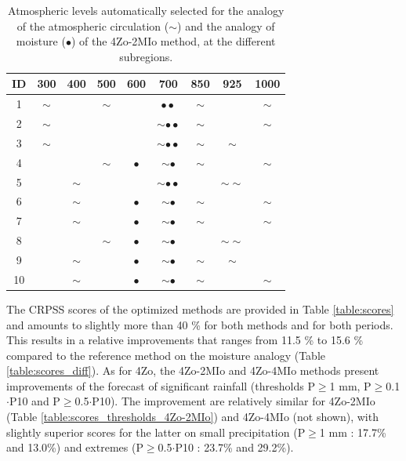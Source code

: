\documentclass[5p]{elsarticle}
\begin{document}
\begin{table}[htbp]
	\caption{Atmospheric levels automatically selected for the analogy of the atmospheric circulation ($\sim$) and the analogy of moisture ($\bullet$) of the 4Zo-2MIo method, at the different subregions.}
	\footnotesize
	\begin{center}
		\begin{tabular}{ccccccccc}
			\hline ID & 300 & 400 & 500 & 600 & 700 & 850 & 925 & 1000 \\ 
			\hline 
			1  & $\sim$ &   & $\sim$ &   & $\bullet \bullet$  & $\sim$ &   & $\sim$ \\
			2  & $\sim$ &   &   &   & $\sim \bullet \bullet$ & $\sim$ &   & $\sim$ \\
			3  & $\sim$ &   &   &   & $\sim \bullet \bullet$ & $\sim$ & $\sim$ &   \\
			4  &   &   & $\sim$ & $\bullet$ & $\sim \bullet$ & $\sim$ &   & $\sim$ \\
			5  &   & $\sim$ &   &   & $\sim \bullet \bullet$ &   & $\sim \sim$ &   \\
			6  &   & $\sim$ &   & $\bullet$ & $\sim \bullet$ & $\sim$ &   & $\sim$ \\
			7  &   & $\sim$ &   & $\bullet$ & $\sim \bullet$ & $\sim$ &   & $\sim$ \\
			8  &   &   & $\sim$ & $\bullet$ & $\sim \bullet$ &   & $\sim \sim$ &   \\
			9  &   & $\sim$ &   & $\bullet$ & $\sim \bullet$ & $\sim$ & $\sim$ &   \\
			10 &   & $\sim$ &   & $\bullet$ & $\sim \bullet$ & $\sim$ &   & $\sim$ \\
			\hline 
		\end{tabular} 
	\end{center}
	\label{table:levels_GA_4Zo_2MIo}
\end{table}


The CRPSS scores of the optimized methods are provided in Table \ref{table:scores} and amounts to slightly more than 40 \% for both methods and for both periods. This results in a relative improvements that ranges from 11.5 \% to 15.6 \% compared to the reference method on the moisture analogy (Table \ref{table:scores_diff}). As for 4Zo, the 4Zo-2MIo and 4Zo-4MIo methods present improvements of the forecast of significant rainfall (thresholds P\(\geq\)1 mm, P\(\geq\)0.1\(\cdot\)P10 and P\(\geq\)0.5\(\cdot\)P10). The improvement are relatively similar for 4Zo-2MIo (Table \ref{table:scores_thresholds_4Zo-2MIo}) and 4Zo-4MIo (not shown), with slightly superior scores for the latter on small precipitation (P\(\geq\)1 mm : 17.7\% and 13.0\%) and extremes (P\(\geq\)0.5\(\cdot\)P10 : 23.7\% and 29.2\%).
\end{document}
